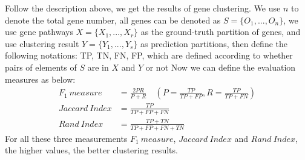 \documentclass{bmcart}
\begin{document}
Follow the description above, we get the results of gene clustering. We use $n$ to denote the total gene number, all genes can be denoted as $S=\{O_1,...,O_n\}$, we use gene pathways $X=\{X_1,...,X_r\}$ as the ground-truth partition of genes, and use clustering result $Y=\{Y_1,...,Y_s\}$ as prediction partitions, then define the following notations: TP, TN, FN, FP, which are defined according to whether pairs of elements of $S$ are in $X$ and $Y$ or not
Now we can define the evaluation measures as below:
\begin{equation}\label{}\nonumber
\begin{split}
F_{1}\ measure&=\frac{2PR}{P+R}\quad(P=\frac{TP}{TP+FP},  R=\frac{TP}{TP+FN}) \\
Jaccard\ Index&=\frac{TP}{TP+FP+FN}\\
Rand\ Index&=\frac{TP+TN}{TP+FP+FN+TN}
\end{split}
\end{equation}
For all these three measurements $F_1\ measure$, $Jaccard\ Index$ and $Rand\ Index$, the higher values, the better clustering results.
\end{document}

